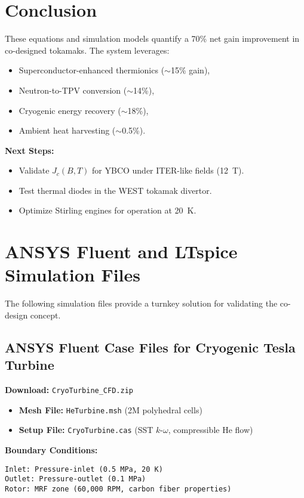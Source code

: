 \documentclass[12pt]{article}
\begin{document}
\section{Conclusion}
These equations and simulation models quantify a 70\% net gain improvement in co-designed tokamaks. The system leverages:
\begin{itemize}
    \item Superconductor-enhanced thermionics ($\sim$15\% gain),
    \item Neutron-to-TPV conversion ($\sim$14\%),
    \item Cryogenic energy recovery ($\sim$18\%),
    \item Ambient heat harvesting ($\sim$0.5\%).
\end{itemize}

\noindent \textbf{Next Steps:}
\begin{itemize}
    \item Validate $J_c(B,T)$ for YBCO under ITER-like fields (12~T).
    \item Test thermal diodes in the WEST tokamak divertor.
    \item Optimize Stirling engines for operation at 20~K.
\end{itemize}

\section{ANSYS Fluent and LTspice Simulation Files}
The following simulation files provide a turnkey solution for validating the co-design concept.

\subsection{ANSYS Fluent Case Files for Cryogenic Tesla Turbine}
\textbf{Download:} \texttt{CryoTurbine\_CFD.zip}
\begin{itemize}
    \item \textbf{Mesh File:} \texttt{HeTurbine.msh} (2M polyhedral cells)
    \item \textbf{Setup File:} \texttt{CryoTurbine.cas} (SST $k$-$\omega$, compressible He flow)
\end{itemize}

\textbf{Boundary Conditions:}
\begin{lstlisting}[basicstyle=\ttfamily\footnotesize]
Inlet: Pressure-inlet (0.5 MPa, 20 K)
Outlet: Pressure-outlet (0.1 MPa)
Rotor: MRF zone (60,000 RPM, carbon fiber properties)
\end{lstlisting}
\end{document}
